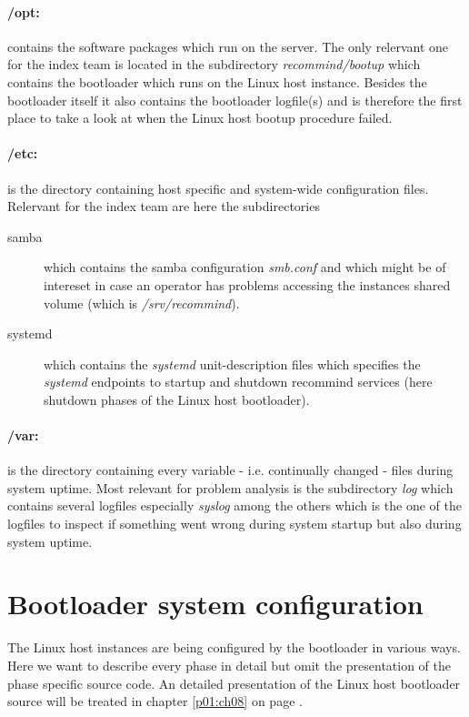	\paragraph{/opt:} contains the software packages which run on the server. The only relervant one for the index team is located in the subdirectory \emph{recommind/bootup} which contains the bootloader which runs on the Linux host instance. Besides the bootloader itself it also contains the bootloader logfile(s) and is therefore the first place to take a look at when the Linux host bootup procedure failed.
	
	\paragraph{/etc:} is the directory containing host specific and system-wide configuration files. Relervant for the index team are here the subdirectories
	\begin{description}
		\item[samba] which contains the samba configuration \emph{smb.conf} and which might be of intereset in case an operator has problems accessing the instances shared volume (which is \emph{/srv/recommind}).
		\item[systemd] which contains the \emph{systemd} unit-description files which specifies the \emph{systemd} endpoints to startup and shutdown recommind services (here shutdown phases of the Linux host bootloader).
	\end{description}
	
	\paragraph{/var:} is the directory containing every variable - i.e. continually changed - files during system uptime. Most relevant for problem analysis is the subdirectory \emph{log} which contains several logfiles especially \emph{syslog} among the others which is the one of the logfiles to inspect if something went wrong during system startup but also during system uptime.
	
	\section{Bootloader system configuration}
	The Linux host instances are being configured by the bootloader in various ways. Here we want to describe every phase in detail but omit the presentation of the phase specific source code. An detailed presentation of the Linux host bootloader source will be treated in chapter \ref{p01:ch08} on page \pageref{p01:ch08}.
	
